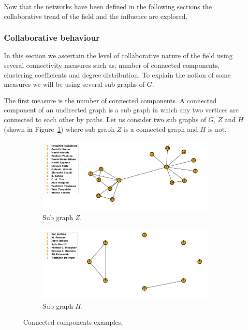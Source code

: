 \documentclass{article}
\begin{document}
Now that the networks have been defined in the following sections the collaborative
trend of the field and the influence are explored.

\subsubsection{Collaborative behaviour}

In this section we ascertain the level of collaborative nature of the field
using several connectivity measures such as, number of connected components,
clustering coefficients and degree distribution. To explain the notion of some
measures we will be using several sub graphs of \(G\).

The first measure is the number of connected components.
A connected component of an undirected graph is a sub graph in which any two
vertices are connected to each other by paths. Let us consider two sub graphs of
\(G\), \(Z\) and \(H\) (shown in Figure~\ref{fig:connected_components}) where sub
graph \(Z\) is a connected graph and \(H\) is not.

\begin{center}
\begin{figure}[!hbtp]
    \begin{subfigure}{0.5\textwidth}
        \includegraphics[width=\textwidth]{./assets/images/connected_example_one.pdf}
        \caption{Sub graph \(Z\).}
    \end{subfigure}
    \begin{subfigure}{0.5\textwidth}
        \includegraphics[width=\textwidth]{./assets/images/connected_example_two.pdf}
        \caption{Sub graph \(H\).}
    \end{subfigure}
\caption{Connected components examples.}
\label{fig:connected_components}
\end{figure}
\end{center}
\end{document}
